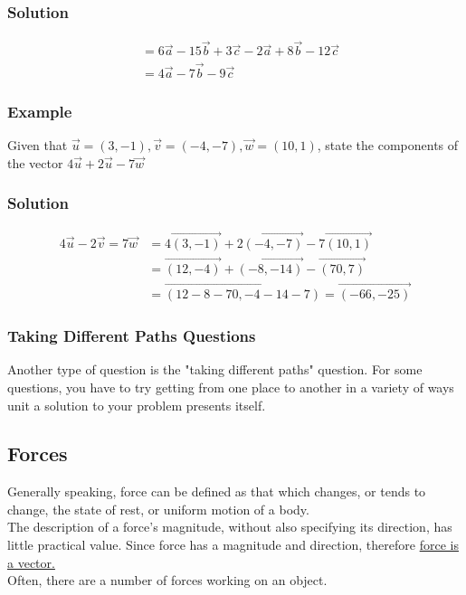 \documentclass{article}
\begin{document}
\subsubsection*{Solution}
\begin{align*}
    &=6\vec{a}-15\vec{b}+3\vec{c}-2\vec{a}+8\vec{b}-12\vec{c}\\
    &=4\vec{a}-7\vec{b}-9\vec{c}
\end{align*}
\subsubsection*{Example}
Given that $\vec{u}=(3,-1), \vec{v}=(-4,-7), \vec{w}=(10,1)$, state the components of the vector $4\vec{u}+2\vec{u}-7\vec{w}$
\subsubsection*{Solution}
\begin{align*}
    4\vec{u}-2\vec{v}=7\vec{w}&=4\overrightarrow{(3,-1)}+2\overrightarrow{(-4,-7)}-7\overrightarrow{(10,1)}\\
    &=\overrightarrow{(12,-4)}+\overrightarrow{(-8,-14)}-\overrightarrow{(70,7)}\\
    &=\overrightarrow{(12-8-70,-4-14-7)}=\overrightarrow{(-66,-25)}
\end{align*}
\subsubsection{Taking Different Paths Questions }
Another type of question is the "taking different paths" question. For some questions, you have to try getting from one place to another in a variety of ways unit a solution to your problem presents itself.


\subsection{Forces}
Generally speaking, force can be defined as that which changes, or tends to change, the state of rest, or uniform motion of a body.\\
The description of a force's magnitude, without also specifying its direction, has little practical value. Since force has a magnitude and direction, therefore \underline{force is a vector.}\\

Often, there are a number of forces working on an object. 
\end{document}
